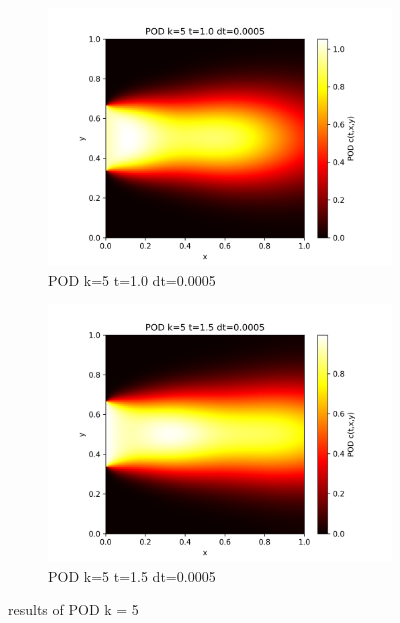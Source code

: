 \documentclass[11pt,a4 paper,one side]{article}
\begin{document}
\begin{figure}[htbp]
    \begin{subfigure}{0.45\textwidth}
        \includegraphics[width=\textwidth]{POD k=5 t=1.0 dt=0.0005.png}
        \caption{POD k=5 t=1.0 dt=0.0005}
        \label{POD k=5 t=1.0 dt=0.0005}
    \end{subfigure}
    \hfill
    \begin{subfigure}{0.45\textwidth}
        \includegraphics[width=\textwidth]{POD k=5 t=1.5 dt=0.0005.png}
        \caption{POD k=5 t=1.5 dt=0.0005}
        \label{POD k=5 t=1.5 dt=0.0005}
    \end{subfigure}
    
    \caption{results of POD k = 5}
    \label{results of POD k = 5}
\end{figure}
\end{document}
